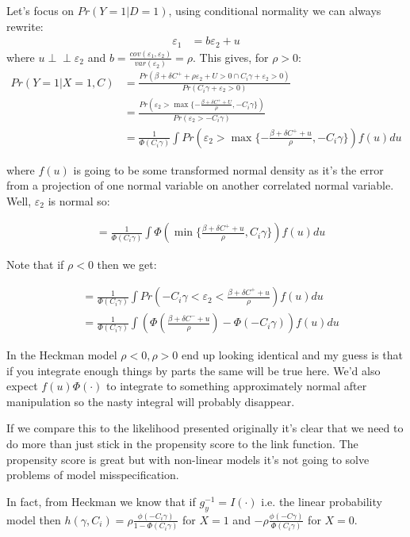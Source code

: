 \documentclass{article}
\newcommand{\indep}{\perp \!\!\! \perp}
\begin{document}
Let's focus on $Pr( Y = 1 | D = 1)$, using conditional normality we can always rewrite:
\begin{align*}
    \varepsilon_1 &= b\varepsilon_2 + u
\end{align*}
where $u \indep \varepsilon_2$ and $b = \frac{cov(\varepsilon_1, \varepsilon_2)}{var(\varepsilon_2)} = \rho$. 
This gives, for $\rho > 0$:
\begin{align*}
    Pr(Y = 1 | X = 1, C) &= \frac{Pr(\beta + \delta C^+ + \rho \varepsilon_2 + U > 0 \cap C_i \gamma + \varepsilon_2  > 0)}{
    Pr(C_i \gamma + \varepsilon_2 > 0)} \\
    &= \frac{Pr(\varepsilon_2 > \max \{ - \frac{\beta + \delta C^+ + U}{\rho}, -C_i \gamma\})}{
        Pr(\varepsilon_2 > -C_i \gamma)
    } \\
    &= \frac{1}{\Phi(C_i \gamma)} \int
    Pr(\varepsilon_2 > \max \{ - \frac{\beta + \delta C^+ + u}{\rho}, -C_i \gamma\}) f(u) du
\end{align*}


where $f(u)$ is going to be some transformed normal density as it's the error from a projection 
of one normal variable on another correlated normal variable. Well, $\varepsilon_2$ is 
normal so:

\begin{align*}
    &= \frac{1}{\Phi(C_i \gamma)} \int
    \Phi\left( \min \{  \frac{\beta + \delta C^+ + u}{\rho}, C_i \gamma\}\right) f(u) du
\end{align*}


Note that if $\rho < 0$ then we get:

\begin{align*}
    &= \frac{1}{\Phi(C_i \gamma)} \int
    Pr(-C_i \gamma < \varepsilon_2 <  \frac{\beta + \delta C^+ + u}{\rho}) f(u) du \\
    &= \frac{1}{\Phi(C_i \gamma)} \int \left(
    \Phi\left(\frac{\beta + \delta C^- + u}{\rho}\right) - \Phi(-C_i \gamma)\right) f(u) du 
\end{align*}

In the Heckman model $\rho < 0, \rho > 0$ end up looking identical and my guess is 
that if you integrate enough things by parts the same will be true here. We'd also 
expect $f(u) \Phi(\cdot)$ to integrate to something approximately normal after 
manipulation so the nasty integral will probably disappear.

If we compare this to the likelihood presented originally it's clear that we need 
to do more than just stick in the propensity score to the link function. The 
propensity score is great but with non-linear models it's not going to solve 
problems of model misspecification.


In fact, 
from Heckman we know that if $g_y^{-1} = I(\cdot)$ i.e. the linear probability model
then $h(\gamma, C_i) = \rho \frac{\phi(-C_i\gamma)}{1 - \Phi(C_i \gamma)}$ for $X = 1$ 
and $-\rho \frac{\phi(-C\gamma)}{\Phi(C_i \gamma)}$ for $X = 0$.
\end{document}
